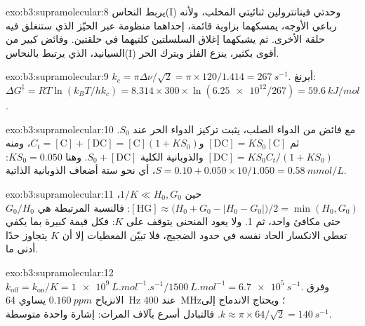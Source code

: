 \begin{solution}{exo:b3:supramolecular:8}
يربط النحاس(I) وحدتي فينانترولين ثنائيتي المخلب، ولأنه رباعي الأوجه، يمسكهما
بزاوية قائمة، إحداهما منظومة عبر الحيّز الذي ستنغلق فيه حلقة
الأخرى. ثم يشبكهما إغلاق السلسلتين كلتيهما في حلقتين. وفائض كبير من
السيانيد، الذي يرتبط بالنحاس(I) أقوى بكثير، ينزع الفلز ويترك
 الحر.
\end{solution}

\begin{solution}{exo:b3:supramolecular:9}
$k_c = \pi\Delta\nu/\sqrt2 = \pi \times 120/1.414 = \qty{267}{s^{-1}}$. أيرنغ:
$\Delta G^\ddagger = RT\ln(k_BT/hk_c) = 8.314 \times 300 \times \ln(\num{6.25e12}/267) = \qty{59.6}{kJ/mol}$.
\end{solution}

\begin{solution}{exo:b3:supramolecular:10}
مع فائض من الدواء الصلب، يثبت تركيز الدواء الحر عند $S_0$. ثم $[\mathrm{DC}] = KS_0[\mathrm C]$ 
و$C_t = [\mathrm C] + [\mathrm{DC}] = [\mathrm C](1 + KS_0)$، ومنه $[\mathrm{DC}] = KS_0C_t/(1 + KS_0)$ والذوبانية الكلية $S_0 + [\mathrm{DC}]$. وهنا
$KS_0 = 0.050$: $S = 0.10 + 0.050 \times 10/1.050 = \qty{0.58}{mmol/L}$، أي نحو ستة أضعاف الذوبانية الذاتية.
\end{solution}

\begin{solution}{exo:b3:supramolecular:11}
حين $1/K \ll H_0, G_0$، $[\mathrm{HG}] \approx \bigl(H_0 + G_0 - |H_0 - G_0|\bigr)/2 = \min(H_0, G_0)$: فالنسبة المرتبطة هي $G_0/H_0$ حتى
مكافئ واحد، ثم 1. ولا يعود المنحنى يتوقف على $K$: فكل قيمة كبيرة بما يكفي
تعطي الانكسار الحاد نفسه في حدود الضجيج، فلا تبيّن المعطيات إلا أن $K$ يتجاوز
حدًا أدنى ما.
\end{solution}

\begin{solution}{exo:b3:supramolecular:12}
$k_{\mathrm{off}} = k_{\mathrm{on}}/K = \qty{1e9}{L.mol^{-1}.s^{-1}}/\qty{1500}{L.mol^{-1}} = \qty{6.7e5}{s^{-1}}$. وفرق الانزياح
$\qty{0.160}{ppm}$ يساوي \qty{64}{Hz} عند \qty{400}{MHz}؛ ويحتاج الاندماج إلى $k \approx \pi \times 64/\sqrt2 = \qty{140}{s^{-1}}$. فالتبادل
أسرع بآلاف المرات: إشارة واحدة متوسطة.
\end{solution}

